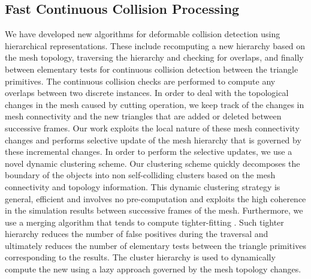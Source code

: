 \subsection{Fast Continuous Collision Processing}
\label{ssec:fast_ccd}
We have  developed new algorithms for deformable collision detection using hierarchical representations. These include recomputing a new hierarchy based on the mesh topology, traversing the hierarchy and checking for overlaps, and finally between elementary tests for continuous collision detection between the triangle primitives. The continuous collision checks are performed to compute any overlaps between two discrete instances. In order to deal with the topological changes in the mesh caused by cutting operation, we keep track of the changes in mesh connectivity and the new triangles that are added or deleted between successive frames. Our work exploits the local nature of these mesh connectivity changes and performs selective update of the mesh hierarchy that is governed by these incremental changes. In order to perform the selective updates, we use a novel dynamic clustering scheme. Our clustering scheme quickly decomposes the boundary of the objects into non self-colliding clusters based on the mesh connectivity and topology information. This dynamic clustering strategy is general, efficient and involves no pre-computation and exploits the high coherence in the simulation results between successive frames of the mesh. Furthermore, we use a merging algorithm that tends to compute tighter-fitting . Such tighter hierarchy reduces the number of false positives during the traversal and ultimately reduces the number of elementary tests between the triangle primitives corresponding to the  results. The cluster hierarchy is used to dynamically compute the new  using a lazy approach governed by the mesh topology changes.

